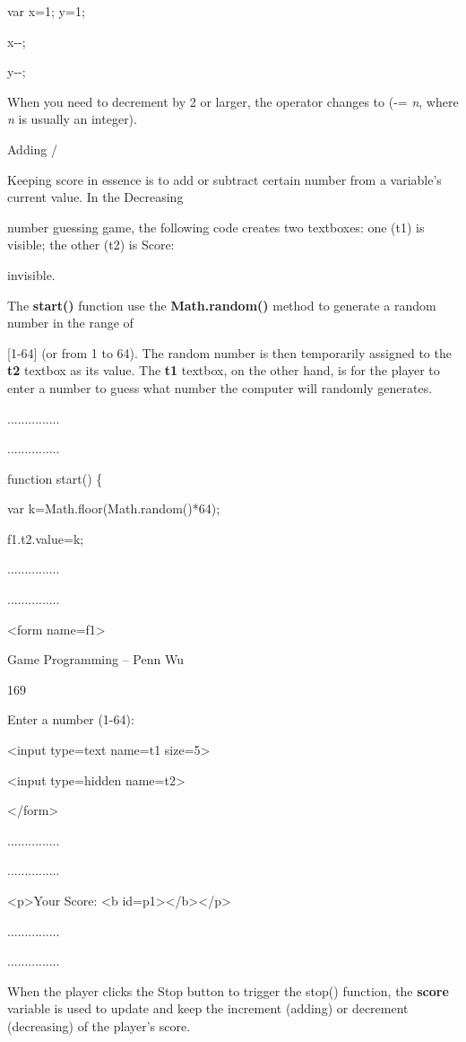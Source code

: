 \documentclass[
]{article}
\begin{document}
var x=1; y=1;

x-\/-;

y-\/-;

When you need to decrement by 2 or larger, the operator changes to (-=
\emph{n}, where \emph{n} is usually an integer).

Adding /

Keeping score in essence is to add or subtract certain number from a
variable's current value. In the Decreasing

number guessing game, the following code creates two textboxes: one (t1)
is visible; the other (t2) is Score:

invisible.

The \textbf{start()} function use the \textbf{Math.random()} method to
generate a random number in the range of

{[}1-64{]} (or from 1 to 64). The random number is then temporarily
assigned to the \textbf{t2} textbox as its value. The \textbf{t1}
textbox, on the other hand, is for the player to enter a number to guess
what number the computer will randomly generates.

...............

...............

function start() \{

var k=Math.floor(Math.random()*64);

f1.t2.value=k;

...............

...............

\textless form name=f1\textgreater{}

Game Programming -- Penn Wu

169

\protect\hypertarget{index_split_011.htmlux5cux23p170}{}{}Enter a number
(1-64):

\textless input type=text name=t1 size=5\textgreater{}

\textless input type=hidden name=t2\textgreater{}

\textless/form\textgreater{}

...............

...............

\textless p\textgreater Your Score: \textless b
id=p1\textgreater\textless/b\textgreater\textless/p\textgreater{}

...............

...............

When the player clicks the Stop button to trigger the stop() function,
the \textbf{score} variable is used to update and keep the increment
(adding) or decrement (decreasing) of the player's score.
\end{document}
